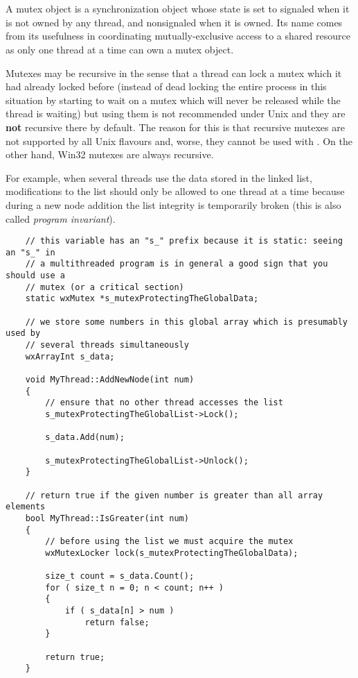 \section{}\label{wxmutex}

A mutex object is a synchronization object whose state is set to signaled when
it is not owned by any thread, and nonsignaled when it is owned. Its name comes
from its usefulness in coordinating mutually-exclusive access to a shared
resource as only one thread at a time can own a mutex object.

Mutexes may be recursive in the sense that a thread can lock a mutex which it
had already locked before (instead of dead locking the entire process in this
situation by starting to wait on a mutex which will never be released while the
thread is waiting) but using them is not recommended under Unix and they are 
{\bf not} recursive there by default. The reason for this is that recursive
mutexes are not supported by all Unix flavours and, worse, they cannot be used
with . On the other hand, Win32 mutexes are
always recursive.

For example, when several threads use the data stored in the linked list,
modifications to the list should only be allowed to one thread at a time
because during a new node addition the list integrity is temporarily broken
(this is also called {\it program invariant}).


{\small%
\begin{verbatim}
    // this variable has an "s_" prefix because it is static: seeing an "s_" in
    // a multithreaded program is in general a good sign that you should use a
    // mutex (or a critical section)
    static wxMutex *s_mutexProtectingTheGlobalData;

    // we store some numbers in this global array which is presumably used by
    // several threads simultaneously
    wxArrayInt s_data;

    void MyThread::AddNewNode(int num)
    {
        // ensure that no other thread accesses the list
        s_mutexProtectingTheGlobalList->Lock();

        s_data.Add(num);

        s_mutexProtectingTheGlobalList->Unlock();
    }

    // return true if the given number is greater than all array elements
    bool MyThread::IsGreater(int num)
    {
        // before using the list we must acquire the mutex
        wxMutexLocker lock(s_mutexProtectingTheGlobalData);

        size_t count = s_data.Count();
        for ( size_t n = 0; n < count; n++ )
        {
            if ( s_data[n] > num )
                return false;
        }

        return true;
    }
\end{verbatim}
}

